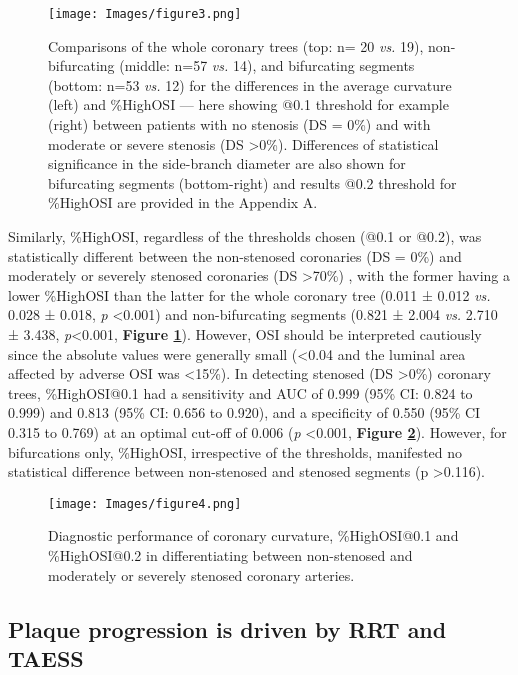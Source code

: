\documentclass[preprint,11pt,review]{elsarticle}
\begin{document}
\begin{figure}
    \centering
    \texttt{[image: Images/figure3.png]}
    \caption{Comparisons of the whole coronary trees (top: n= 20 \textit{vs.} 19), non-bifurcating (middle: n=57 \textit{vs.} 14), and bifurcating segments (bottom: n=53 \textit{vs.} 12) for the differences in the average curvature (left) and \%HighOSI — here showing @0.1 threshold  for example (right) between patients with no stenosis (DS = 0\%) and with moderate or severe stenosis (DS \textgreater  0\%). Differences of statistical significance in the side-branch diameter are also shown for bifurcating segments (bottom-right) and results @0.2 threshold  for \%HighOSI are provided in the Appendix A. }
    \label{fig:onset}
\end{figure}

Similarly, \%HighOSI, regardless of the thresholds chosen (@0.1 or @0.2), was statistically different between the non-stenosed coronaries (DS = 0\%) and moderately or severely stenosed coronaries (DS \textgreater 70\%) , with the former having a lower \%HighOSI than the latter for the whole coronary tree (0.011 ± 0.012 \textit{vs. }0.028 ± 0.018, \textit{p} \textless 0.001) and non-bifurcating segments (0.821 ± 2.004 \textit{vs. }2.710 ± 3.438, \textit{p}\textless0.001, \textbf{Figure \ref{fig:onset}}).  However, OSI should be interpreted cautiously since the absolute values were generally small (\textless 0.04 and the luminal area affected by adverse OSI was \textless 15\%). In detecting stenosed (DS \textgreater 0\%) coronary trees, \%HighOSI@0.1 had a sensitivity and AUC of 0.999 (95\% CI: 0.824 to 0.999) and 0.813 (95\% CI: 0.656 to 0.920), and a specificity of 0.550 (95\% CI 0.315 to 0.769) at an optimal cut-off of 0.006 (\textit{p} \textless 0.001, \textbf{Figure \ref{fig:diagnostics}}). However, for bifurcations only, \%HighOSI, irrespective of the thresholds, manifested no statistical difference between non-stenosed and stenosed segments (p \textgreater0.116).

\begin{figure}
    \centering
    \texttt{[image: Images/figure4.png]}
    \caption{Diagnostic performance of coronary curvature, \%HighOSI@0.1 and \%HighOSI@0.2 in differentiating between non-stenosed and moderately or severely stenosed coronary arteries.}
    \label{fig:diagnostics}
\end{figure}


   
\subsection{Plaque progression is driven by RRT and TAESS}
\end{document}
